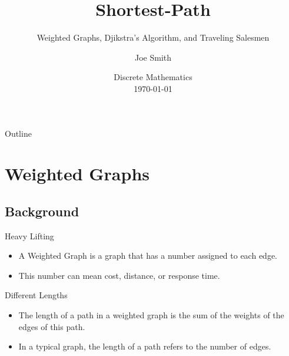 \documentclass{beamer}
\title[] %
{Shortest-Path}
\subtitle
{Weighted Graphs, Djikstra's Algorithm, and Traveling Salesmen} %
\author{Joe Smith} %
\institute[] %
{
  Department of Computer Science\\
  Chapman University}
\date[] %
{Discrete Mathematics\\ \today}
\begin{document}
\begin{frame}
  \titlepage
\end{frame}

\begin{frame}{Outline}
  \tableofcontents
\end{frame}




\section{Weighted Graphs}

\subsection{Background}

\begin{frame}{Heavy Lifting}

  \begin{itemize}
  \item
    A \alert{Weighted Graph} is a graph that has a number assigned to each edge.
  \item
    This number can mean cost, distance, or response time.
  \end{itemize}
\end{frame}

\begin{frame}{Different Lengths}

  \begin{itemize}
  \item
	The \alert{length} of a path in a weighted graph is the sum of the weights of the edges of this path.
  \item 
	In a typical graph, the \alert{length} of a path refers to the number of edges.
  \end{itemize}
\end{frame}
\end{document}
